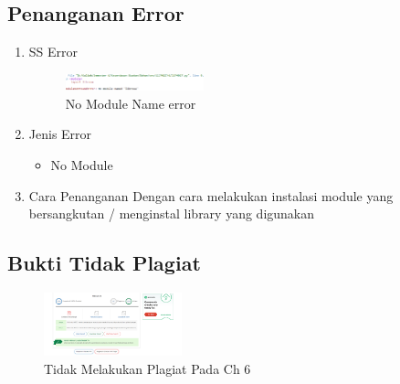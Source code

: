 \subsection{Penanganan Error}
\begin{enumerate}
	\item SS Error
	\begin{figure}[H]
		\includegraphics[width=4cm]{figures/1164013/err/6_no_module.png}
		\centering
		\caption{No Module Name error}
	\end{figure}
	\item Jenis Error
	\begin{itemize}
		\item No Module
	\end{itemize}
	\item Cara Penanganan
	\hfill\break
	Dengan cara melakukan instalasi module yang bersangkutan / menginstal library yang digunakan
\end{enumerate}
\subsection{Bukti Tidak Plagiat}
\begin{figure}[H]
    \includegraphics[width=4cm]{figures/1164013/ve/6.png}
    \centering
    \caption{Tidak Melakukan Plagiat Pada Ch 6}
\end{figure}